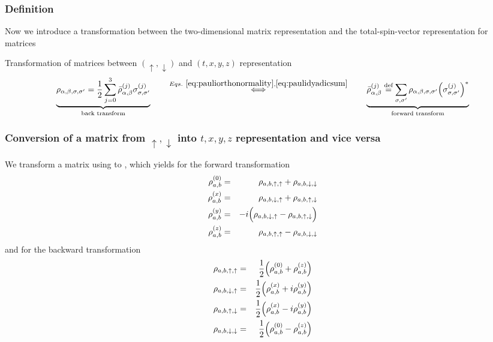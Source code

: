 \documentclass[11pt,a4paper]{report}
\begin{document}
\subsubsection{Definition}
Now we introduce a transformation between the two-dimensional matrix
representation and the total-spin-vector representation for matrices
\begin{myshadowminipage}{Transformation of matrices between 
$(\uparrow,\downarrow)$ and $(t,x,y,z)$ representation}
\begin{eqnarray}
\underbrace{\rho_{\alpha,\beta,\sigma,\sigma'}=\frac{1}{2}
\sum_{j=0}^3\bar{\rho}^{(j)}_{\alpha,\beta}\sigma^{(j)}_{\sigma,\sigma'}
}_{\text{back transform}}
\qquad\stackrel{Eqs.~\ref{eq:pauliorthonormality},\ref{eq:paulidyadicsum}}
{\Longleftrightarrow}\qquad
\underbrace{\bar{\rho}^{(j)}_{\alpha,\beta}\stackrel{\text{def}}{=}\sum_{\sigma,\sigma'} 
\rho_{\alpha,\beta,\sigma,\sigma'}\Bigr(\sigma^{(j)}_{\sigma,\sigma'}\Bigr)^*
}_{\text{forward transform}}
\label{eq:defdensitymatrixwithspindeptotandcart}
\end{eqnarray}
\end{myshadowminipage}


\subsubsection{Conversion of a matrix from $\uparrow,\downarrow$ 
into $t,x,y,z$ representation and vice versa}
We transform a matrix using
to , which yields for the
forward transformation
\begin{eqnarray}
\rho^{(0)}_{a,b}&=&\rho_{a,b,\uparrow,\uparrow}+\rho_{a,b,\downarrow,\downarrow}
\nonumber\\
\rho^{(x)}_{a,b}&=&\rho_{a,b,\downarrow,\uparrow}+\rho_{a,b,\uparrow,\downarrow}
\nonumber\\
\rho^{(y)}_{a,b}&=&-i
\Bigl(\rho_{a,b,\downarrow,\uparrow}-\rho_{a,b,\uparrow,\downarrow}\Bigr)
\nonumber\\
\rho^{(z)}_{a,b}&=&\rho_{a,b,\uparrow,\uparrow}-\rho_{a,b,\downarrow,\downarrow}
\label{eq:defdensitymatrixforwardexplicit}
\end{eqnarray}
and for the backward transformation
\begin{eqnarray}
\rho_{a,b,\uparrow,\uparrow}&=&\frac{1}{2}\Bigl(\rho^{(0)}_{a,b}+\rho^{(z)}_{a,b}\Bigr)
\nonumber\\
\rho_{a,b,\downarrow,\uparrow}&=&\frac{1}{2}\Bigl(\rho^{(x)}_{a,b}+i\rho^{(y)}_{a,b}\Bigr)
\nonumber\\
\rho_{a,b,\uparrow,\downarrow}&=&\frac{1}{2}\Bigl(\rho^{(x)}_{a,b}-i\rho^{(y)}_{a,b}\Bigr)
\nonumber\\
\rho_{a,b,\downarrow,\downarrow}&=&\frac{1}{2}\Bigl(\rho^{(0)}_{a,b}-\rho^{(z)}_{a,b}\Bigr)
\label{eq:defdensitymatrixbackexplicit}
\end{eqnarray}
\end{document}
